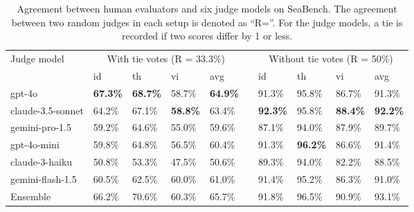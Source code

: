 \begin{table*}[!ht]
    \centering
    \small
    \begin{tabular}{llllllllll}
        \toprule
         \multirow{2}{*}{Judge model}& \multicolumn{4}{c}{With tie votes (R = 33.3\%)} & & \multicolumn{4}{c}{Without tie votes (R = 50\%)} \\ 
         \cmidrule{2-5} \cmidrule{7-10}
        & id & th & vi & avg & & id & th & vi & avg \\ 
        \midrule
        gpt-4o & \textbf{67.3\%} & \textbf{68.7\%} & 58.7\% & \textbf{64.9\%} & &91.3\% & 95.8\% & 86.7\% & 91.3\% \\ 
        claude-3.5-sonnet & 64.2\% & 67.1\% & \textbf{58.8\%} & 63.4\% & &\textbf{92.3\%} & 95.8\% & \textbf{88.4\%} & \textbf{92.2\%} \\ 
        gemini-pro-1.5 & 59.2\% & 64.6\% & 55.0\% & 59.6\% & &87.1\% & 94.0\% & 87.9\% & 89.7\% \\ 
        gpt-4o-mini & 59.8\% & 64.8\% & 56.5\% & 60.4\% & &91.3\% & \textbf{96.2\%} & 86.6\% & 91.4\% \\ 
        claude-3-haiku & 50.8\% & 53.3\% & 47.5\% & 50.6\% & &89.3\% & 94.0\% & 82.2\% & 88.5\% \\ 
        gemini-flash-1.5 & 60.5\% & 62.5\% & 60.0\% & 61.0\% & &91.4\% & 95.2\% & 86.3\% & 91.0\% \\ 
        \midrule
        Ensemble & 66.2\% & 70.6\% & 60.3\% & 65.7\% &  & 91.8\% & 96.5\% & 90.9\% & 93.1\% \\ 
        \bottomrule
    \end{tabular}
    \caption{Agreement between human evaluators and six judge models on SeaBench. The agreement between two random judges in each setup is denoted as “R=”. For the judge models, a tie is recorded if two scores differ by 1 or less.}
    \label{tab:seabench_agreement_thres_1}
\end{table*}
